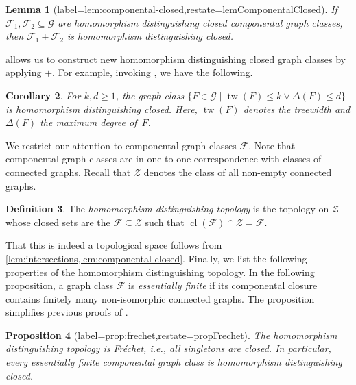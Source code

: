 \documentclass[11pt]{scrartcl}
\theoremstyle{definition}
\newtheorem{definition}{Definition}[section]
\theoremstyle{plain}
\newtheorem{lemma}[definition]{Lemma}
\newtheorem{corollary}[definition]{Corollary}
\newtheorem{proposition}[definition]{Proposition}
\theoremstyle{remark}
\DeclareMathOperator{\cl}{cl}
\DeclareMathOperator{\tw}{tw}
\newcommand{\G}{\mathcal{G}}
\newcommand{\Z}{\mathcal{Z}}
\begin{document}
    \begin{lemma}[label=lem:componental-closed,restate=lemComponentalClosed]
        If $\mathcal{F}_1, \mathcal{F}_2 \subseteq \G$
		are homomorphism distinguishing closed componental graph classes,
		then $\mathcal{F}_1 + \mathcal{F}_2$ is homomorphism distinguishing closed.
    \end{lemma}
    

	 allows us to construct new homomorphism distinguishing closed graph classes by applying $+$.
	For example, invoking \cite{neuen_homomorphism-distinguishing_2024,roberson_oddomorphisms_2022}, we have the following.
	\begin{corollary}
		For $k, d \geq 1$,
		the graph class $\{F \in \G \mid \tw(F) \leq k \lor \Delta(F) \leq d \}$
		is homomorphism distinguishing closed.
		Here, $\tw(F)$ denotes the treewidth and $\Delta(F)$ the maximum degree of~$F$.
	\end{corollary}

	We restrict our attention to componental graph classes $\mathcal{F}$.
	Note that componental graph classes are in one-to-one correspondence with classes of connected graphs.
	Recall that $\mathcal{Z}$ denotes the class of all non-empty connected graphs.

	\begin{definition}\label{def:hom-dist-topology}
		The \emph{homomorphism distinguishing topology} is the topology on $\mathcal{Z}$ whose closed sets are the $\mathcal{F} \subseteq \mathcal{Z}$ such that $\cl(\mathcal{F}) \cap \Z = \mathcal{F}$.
	\end{definition}

	That this is indeed a topological space follows from \cref{lem:intersections,lem:componental-closed}.
	Finally, we list the following properties of the homomorphism distinguishing topology.
	In the following proposition, 
	a graph class $\mathcal{F}$ is \emph{essentially finite} if its componental closure contains finitely many non-isomorphic connected graphs.
	The proposition simplifies previous proofs of \cite{kwiecien_determinacy_2022,seppelt_logical_2024}.

	\begin{proposition}[label=prop:frechet,restate=propFrechet]
		The homomorphism distinguishing topology is Fr\'echet, i.e., all singletons are closed.
		In particular, every essentially finite componental graph class is homomorphism distinguishing closed.
	\end{proposition}
    
\end{document}
